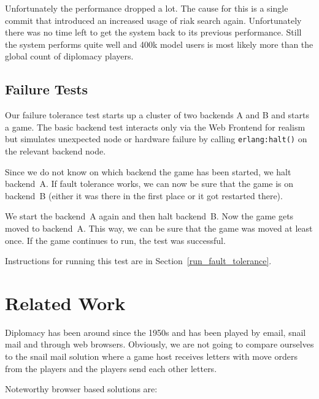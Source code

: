 \documentclass[11pt,a4paper]{report}
\newcommand{\hi}[1]{{\color{red}\em #1\/}\\}
\begin{document}
Unfortunately the performance dropped a lot.
The cause for this is a single commit that introduced an increased usage of riak search again.
Unfortunately there was no time left to get the system back to its previous performance.
Still the system performs quite well and 400k model users is most likely
more than the global count of diplomacy players.


\section{Failure Tests}
Our failure tolerance test starts up a cluster of two backends A and B and
starts a game. The basic backend test interacts only via the Web Frontend
for realism but simulates unexpected node or hardware failure by calling
{\tt erlang:halt()} on the relevant backend node.

Since we do not know on which backend the game has been started, we halt
backend~A. If fault tolerance works, we can now be sure that the game is on
backend~B (either it was there in the first place or it got restarted there).

We start the backend~A again and then halt backend~B. Now the game gets moved to
backend~A. This way, we can be sure that the game was moved at least once.
If the game continues to run, the test was successful.

Instructions for running this test are in Section~\ref{run_fault_tolerance}.

\chapter{Related Work}


Diplomacy has been around since the 1950s and has been played by email, snail
mail and through web browsers. Obviously, we are not going to compare ourselves
to the snail mail solution where a game host receives letters with move orders
from the players and the players send each other letters.

Noteworthy browser based solutions are:\\
\end{document}
